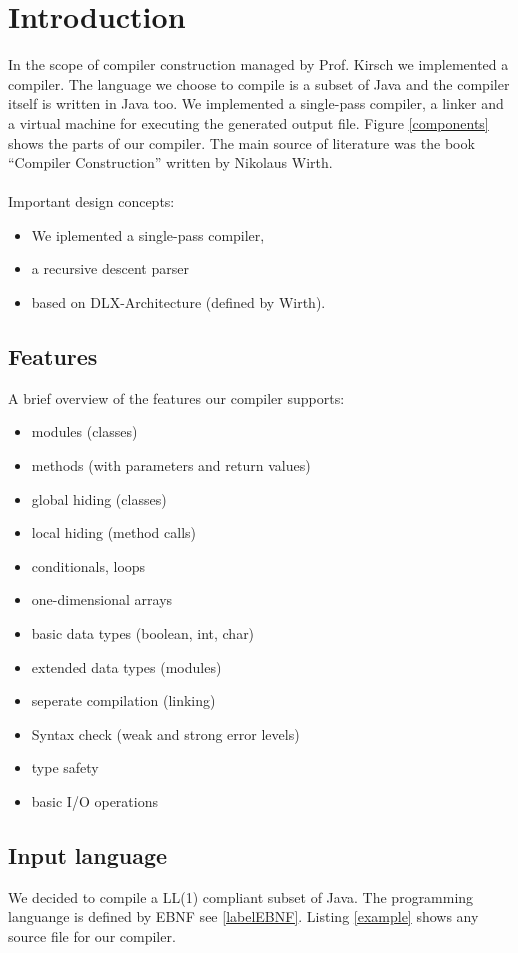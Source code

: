 \section{Introduction}
In the scope of compiler construction managed by Prof. Kirsch we implemented a compiler. The language we choose to compile is a subset of Java and the compiler itself is written in Java too. We implemented a single-pass compiler, a linker and a virtual machine for executing the generated output file. Figure \ref{components} shows the parts of our compiler. The main source of literature was the book ``Compiler Construction'' written by Nikolaus Wirth.
\paragraph{} Important design concepts:
\begin{itemize}
 \item We iplemented a single-pass compiler, 
 \item a recursive descent parser 
 \item based on DLX-Architecture (defined by Wirth).
\end{itemize}
\subsection{Features}A brief overview of the features our compiler supports:
\begin{itemize}
\item modules (classes)
\item methods (with parameters and return values)
\item global hiding (classes)
\item local hiding (method calls)
\item conditionals, loops
\item one-dimensional arrays
\item basic data types (boolean, int, char)
\item extended data types (modules)
\item seperate compilation (linking)
\item Syntax check (weak and strong error levels)
\item type safety
\item basic I/O operations
\end{itemize}



\subsection{Input language}
We decided to compile a LL(1) compliant subset of Java. The programming languange is defined by EBNF see \ref{labelEBNF}.
Listing \ref{example} shows any source file for our compiler.

